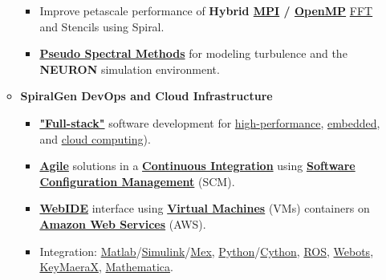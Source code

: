 \documentclass{article}
\begin{document}
\begin{itemize}
\begin{itemize}
\begin{itemize}
          \item Improve petascale performance of \textbf{Hybrid \href{http://en.wikipedia.org/wiki/Message_Passing_Interface}{MPI} / \href{http://en.wikipedia.org/wiki/OpenMP}{OpenMP}} \href{https://en.wikipedia.org/wiki/Fast_Fourier_transform}{FFT} and Stencils using Spiral.

          \item \textbf{\href{https://en.wikipedia.org/wiki/Pseudo-spectral_method}{Pseudo Spectral Methods}} for modeling turbulence and the \textbf{NEURON} simulation environment. 

        \end{itemize}

    \item \textbf{SpiralGen DevOps and Cloud Infrastructure}

      \begin{itemize}

        \item \textbf{\href{https://www.google.com/search?q=full+stack+software&oq=full+stack+software&aqs=chrome..69i57.2623j0j7&sourceid=chrome&es_sm=122&ie=UTF-8}{"Full-stack"}} software development for \href{https://en.wikipedia.org/wiki/Supercomputer}{high-performance}, \href{https://en.wikipedia.org/wiki/Embedded_system}{embedded}, and \href{https://en.wikipedia.org/wiki/Cloud_computing}{cloud computing}). 

        \item \textbf{\href{https://en.wikipedia.org/wiki/Agile_software_development}{Agile}} solutions in a \textbf{\href{http://en.wikipedia.org/wiki/Continuous_integration}{Continuous Integration}} using \textbf{\href{https://en.wikipedia.org/wiki/Software_configuration_management}{Software Configuration Management}} (SCM).

        \item \textbf{\href{https://dzone.com/articles/who-needs-online-ide}{WebIDE}} interface using \textbf{\href{https://en.wikipedia.org/wiki/Virtual_machine}{Virtual Machines}} (VMs) containers on \textbf{\href{https://en.wikipedia.org/wiki/Amazon_Web_Services}{Amazon Web Services}} (AWS).  

        \item Integration: \href{http://www.mathworks.com/products/matlab/}{Matlab}/\href{http://www.mathworks.com/products/simulink/}{Simulink}/\href{http://www.mathworks.com/help/matlab/ref/mex.html}{Mex}, \href{https://www.python.org/}{Python}/\href{http://cython.org/}{Cython}, \href{http://www.ros.org/}{ROS}, \href{https://www.cyberbotics.com/overview}{Webots}, \href{http://www.ls.cs.cmu.edu/KeYmaeraX/}{KeyMaeraX}, \href{http://www.wolfram.com/mathematica/}{Mathematica}.


\end{itemize}
\end{itemize}
\end{itemize}
\end{document}
